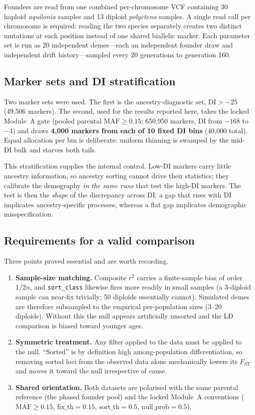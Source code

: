 \documentclass[11pt,a4paper]{article}
\begin{document}
Founders are read from one combined per-chromosome VCF containing 30 haploid
\textit{aquilonia} samples and 13 diploid \textit{polyctena} samples. A single
read call per chromosome is required: reading the two species separately creates
two distinct mutations at each position instead of one shared biallelic marker.
Each parameter set is run as 20 independent demes---each an independent founder
draw and independent drift history---sampled every 20 generations to generation
160.

\subsection{Marker sets and DI stratification}

Two marker sets were used. The first is the ancestry-diagnostic set,
$\mathrm{DI}>-25$ (49{,}506 markers). The second, used for the results reported
here, takes the locked Module~A gate (pooled parental
$\mathrm{MAF}\ge0.15$; 650{,}950 markers, DI from $-168$ to $-4$) and draws
\textbf{4{,}000 markers from each of 10 fixed DI bins} (40{,}000 total). Equal
allocation per bin is deliberate: uniform thinning is swamped by the mid-DI bulk
and starves both tails.

This stratification supplies the internal control. Low-DI markers carry little
ancestry information, so ancestry sorting cannot drive their statistics; they
calibrate the demography \emph{in the same runs} that test the high-DI markers.
The test is then the \emph{shape} of the discrepancy across DI: a gap that rises
with DI implicates ancestry-specific processes, whereas a flat gap implicates
demographic misspecification.

\subsection{Requirements for a valid comparison}

Three points proved essential and are worth recording.

\begin{enumerate}\itemsep2pt
\item \textbf{Sample-size matching.} Composite $r^2$ carries a finite-sample bias
of order $1/2n$, and \texttt{sort\_class} likewise fires more readily in small
samples (a 3-diploid sample can near-fix trivially; 50 diploids essentially
cannot). Simulated demes are therefore subsampled to the empirical
per-population sizes (3--20 diploids). Without this the null appears
artificially unsorted and the LD comparison is biased toward younger ages.
\item \textbf{Symmetric treatment.} Any filter applied to the data must be
applied to the null. ``Sorted'' is by definition high among-population
differentiation, so removing sorted loci from the observed data alone
mechanically lowers its $F_{ST}$ and moves it toward the null irrespective of
cause.
\item \textbf{Shared orientation.} Both datasets are polarised with the same
parental reference (the phased founder pool) and the locked Module~A conventions
($\mathrm{MAF}\ge0.15$, $\mathrm{fix\_th}=0.15$, $\mathrm{sort\_th}=0.5$,
$\mathrm{null\_prob}=0.5$).
\end{enumerate}
\end{document}
